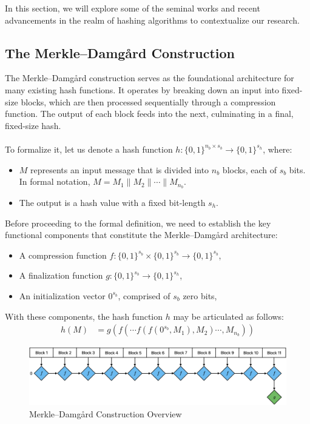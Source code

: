 \documentclass[10pt]{article}
\begin{document}
In this section, we will explore some of the seminal works and recent advancements in the realm of hashing algorithms to contextualize
our research.

\subsection{The Merkle--Damgård Construction}

The Merkle–Damgård construction serves as the foundational architecture for many existing hash functions.
It operates by breaking down an input into fixed-size blocks, which are then processed sequentially through a compression
function. The output of each block feeds into the next, culminating in a final, fixed-size hash.\\\\
To formalize it, let us denote a hash function \( h: \{0,1\}^{n_b \times s_b} \to \{0,1\}^{s_h} \), where:
\begin{itemize}
    \item \( M \) represents an input message that is divided into \( n_b \) blocks, each of \( s_b \) bits. In formal notation, \( M = M_1 \parallel M_2 \parallel \cdots \parallel M_{n_b} \).
    \item The output is a hash value with a fixed bit-length \( s_h \).
\end{itemize}
Before proceeding to the formal definition, we need to establish the key functional components that constitute the Merkle--Damgård architecture:
\begin{itemize}
    \item A compression function \( f: \{0,1\}^{s_b} \times \{0,1\}^{s_b} \to \{0,1\}^{s_b} \),
    \item A finalization function \( g: \{0,1\}^{s_b} \to \{0,1\}^{s_h} \),
    \item An initialization vector \( 0^{s_b} \), comprised of \( s_b \) zero bits,
\end{itemize}

With these components, the hash function \( h \) may be articulated as follows:
\begin{align*}
    h(M) &= g\left( f(\cdots f(f(0^{s_b}, M_1), M_2) \cdots, M_{n_b}) \right)
\end{align*}

\begin{figure}[h]
\centering
\includegraphics[width=1\textwidth]{linear-construction.png}
\caption{Merkle–Damgård Construction Overview}
\label{fig:linear-construction}
\end{figure}
\end{document}
